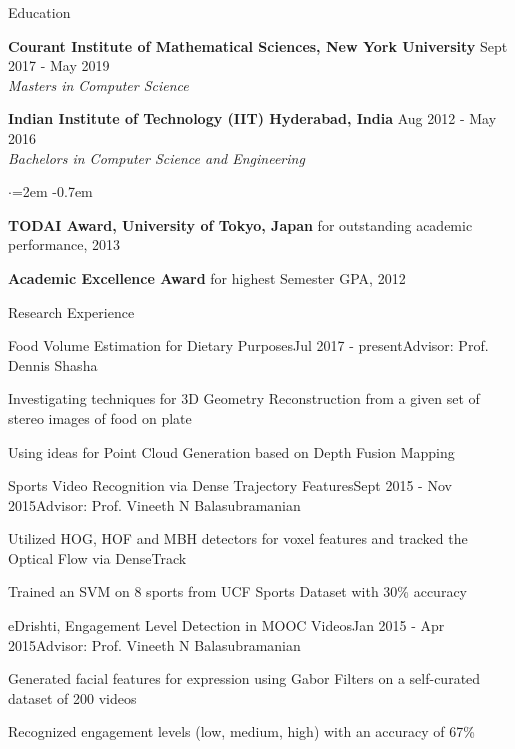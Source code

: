 \documentclass{resume}
\begin{document}
\begin{rSection}{Education}

{\bf Courant Institute of Mathematical Sciences, New York University} \hfill Sept 2017 - May 2019 \\
\it{Masters in Computer Science}

\vspace{-0.4em}

{\bf Indian Institute of Technology (IIT) Hyderabad, India} \hfill Aug 2012 - May 2016 \\
\it{Bachelors in Computer Science and Engineering}
\begin{list}{$\cdot$}{\leftmargin=2em}
\itemsep -0.7em \vspace{-0.5em}
\item {\bf TODAI Award, University of Tokyo, Japan} for outstanding academic performance, 2013
\item {\bf Academic Excellence Award} for highest Semester GPA, 2012
\end{list}

\end{rSection}

\begin{rSection}{Research Experience}

\begin{rSubsection}{Food Volume Estimation for Dietary Purposes}{Jul 2017 - present}{Advisor: Prof. Dennis Shasha}{}
\item Investigating techniques for 3D Geometry Reconstruction from a given set of stereo images of food on plate
\item Using ideas for Point Cloud Generation based on Depth Fusion Mapping

\end{rSubsection}

\begin{rSubsection}{Sports Video Recognition via Dense Trajectory Features}{Sept 2015 - Nov 2015}{Advisor:  Prof. Vineeth N Balasubramanian}{}
\item Utilized HOG, HOF and MBH detectors for voxel features and tracked the Optical Flow via DenseTrack
\item Trained an SVM on 8 sports from UCF Sports Dataset with 30\% accuracy

\end{rSubsection}

\begin{rSubsection}{eDrishti, Engagement Level Detection in MOOC Videos}{Jan 2015 - Apr 2015}{Advisor:  Prof. Vineeth N Balasubramanian}{}
\item Generated facial features for expression using Gabor Filters on a self-curated dataset of 200 videos
\item Recognized engagement levels (low, medium, high) with an accuracy of 67\%

\end{rSubsection}

\end{rSection}
\end{document}
